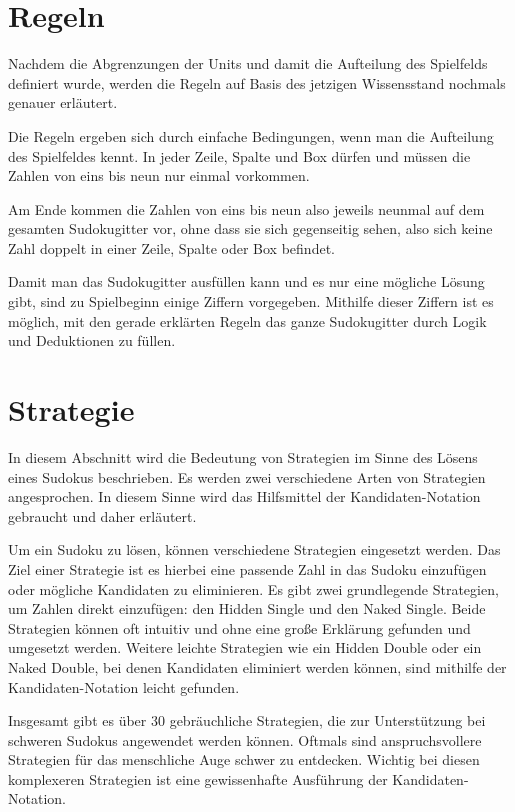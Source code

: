 \section{Regeln}
Nachdem die Abgrenzungen der Units und damit die Aufteilung des Spielfelds definiert wurde, werden die Regeln auf Basis des jetzigen Wissensstand nochmals genauer erläutert.

Die Regeln ergeben sich durch einfache Bedingungen, wenn man die Aufteilung des Spielfeldes kennt. In jeder Zeile, Spalte und Box dürfen und müssen die Zahlen von eins bis neun nur einmal vorkommen.

Am Ende kommen die Zahlen von eins bis neun also jeweils neunmal auf dem gesamten Sudokugitter vor, ohne dass sie sich gegenseitig sehen, also sich keine Zahl doppelt in einer Zeile, Spalte oder Box befindet.

Damit man das Sudokugitter ausfüllen kann und es nur eine mögliche Lösung gibt, sind zu Spielbeginn einige Ziffern vorgegeben. Mithilfe dieser Ziffern ist es möglich, mit den gerade erklärten Regeln das ganze Sudokugitter durch Logik und Deduktionen zu füllen. \cite{sudopedia_2022}

\section{Strategie}
In diesem Abschnitt wird die Bedeutung von Strategien im Sinne des Lösens eines Sudokus beschrieben. Es werden zwei verschiedene Arten von Strategien angesprochen. In diesem Sinne wird das Hilfsmittel der Kandidaten-Notation gebraucht und daher erläutert.

Um ein Sudoku zu lösen, können verschiedene Strategien eingesetzt werden. Das Ziel einer Strategie ist es hierbei eine passende Zahl in das Sudoku einzufügen oder mögliche Kandidaten zu eliminieren. Es gibt zwei grundlegende Strategien, um Zahlen direkt einzufügen: den Hidden Single und den Naked Single. Beide Strategien können oft intuitiv und ohne eine große Erklärung gefunden und umgesetzt werden. Weitere leichte Strategien wie ein Hidden Double oder ein Naked Double, bei denen Kandidaten eliminiert werden können, sind mithilfe der Kandidaten-Notation leicht gefunden.

Insgesamt gibt es über 30 gebräuchliche Strategien, die zur Unterstützung bei schweren Sudokus angewendet werden können. Oftmals sind anspruchsvollere Strategien für das menschliche Auge schwer zu entdecken. Wichtig bei diesen komplexeren Strategien ist eine gewissenhafte Ausführung der Kandidaten-Notation.\cite{martin}

